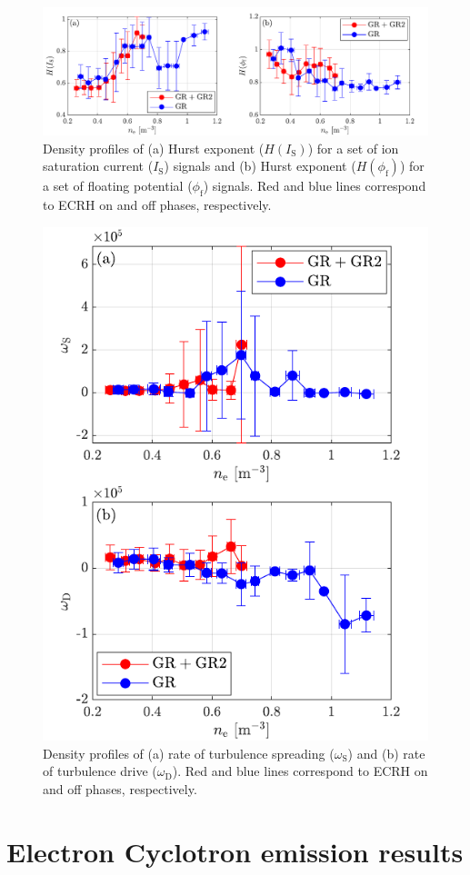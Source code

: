 \documentclass[preprint,12pt,authoryear]{elsarticle}
\begin{document}
\begin{figure}[!ht]

   \includegraphics[width=1.0\columnwidth]{Images/transition_4.pdf}
   \caption{Density profiles of (a) Hurst exponent ($H(I_\mathrm{S})$) for a set of ion saturation current ($I_\mathrm{S}$) signals and 
                                (b) Hurst exponent ($H(\phi_\mathrm{f})$) for a set of floating potential ($\phi_\mathrm{f}$) signals.
                                Red and blue lines correspond to ECRH on and off phases, respectively.}
   \label{Fig:transition_4}
\end{figure}
\begin{figure}[!ht]

   \includegraphics[width=0.5\columnwidth]{Images/transition_5.pdf}
   \caption{Density profiles of (a) rate of turbulence spreading ($\omega_\mathrm{S}$) and 
                                (b) rate of turbulence drive ($\omega_\mathrm{D}$). 
                                Red and blue lines correspond to ECRH on and off phases, respectively.}
   \label{Fig:transition_5}
\end{figure}


\section{Electron Cyclotron emission results}
\end{document}
